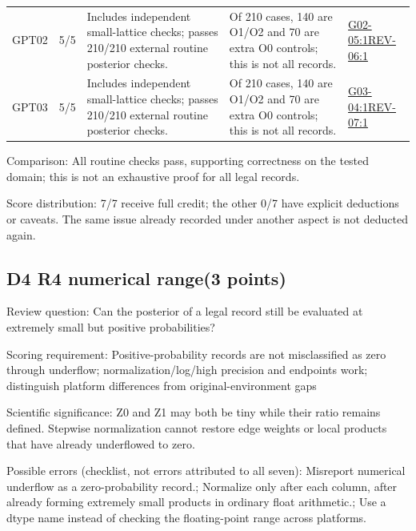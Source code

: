\documentclass[11pt,a4paper]{article}
\begin{document}
{\begin{longtable}
{}GPT02 & 5/\allowbreak{}5 & Includes independent small-lattice checks; passes 210/\allowbreak{}210 external routine posterior checks. & Of 210 cases,\allowbreak{} 140 are O1/\allowbreak{}O2 and 70 are extra O0 controls; this is not all records. & \hyperref[src:G02-05]{G02-05:1}\newline \hyperref[src:REV-06]{REV-06:1}\tabularnewline
{}GPT03 & 5/\allowbreak{}5 & Includes independent small-lattice checks; passes 210/\allowbreak{}210 external routine posterior checks. & Of 210 cases,\allowbreak{} 140 are O1/\allowbreak{}O2 and 70 are extra O0 controls; this is not all records. & \hyperref[src:G03-04]{G03-04:1}\newline \hyperref[src:REV-07]{REV-07:1}\tabularnewline
\bottomrule
\end{longtable}
}
Comparison: All routine checks pass,\allowbreak{} supporting correctness on the tested domain; this is not an exhaustive proof for all legal records.

Score distribution: 7/\allowbreak{}7 receive full credit; the other 0/\allowbreak{}7 have explicit deductions or caveats. The same issue already recorded under another aspect is not deducted again.

\clearpage
\subsection{D4 R4 numerical range(3 points)}
\label{aspect:D4}
Review question: Can the posterior of a legal record still be evaluated at extremely small but positive probabilities?

Scoring requirement: Positive-probability records are not misclassified as zero through underflow; normalization/\allowbreak{}log/\allowbreak{}high precision and endpoints work; distinguish platform differences from original-environment gaps

Scientific significance: Z0 and Z1 may both be tiny while their ratio remains defined. Stepwise normalization cannot restore edge weights or local products that have already underflowed to zero.

Possible errors (checklist,\allowbreak{} not errors attributed to all seven): Misreport numerical underflow as a zero-probability record.; Normalize only after each column,\allowbreak{} after already forming extremely small products in ordinary float arithmetic.; Use a dtype name instead of checking the floating-point range across platforms.
\end{document}
